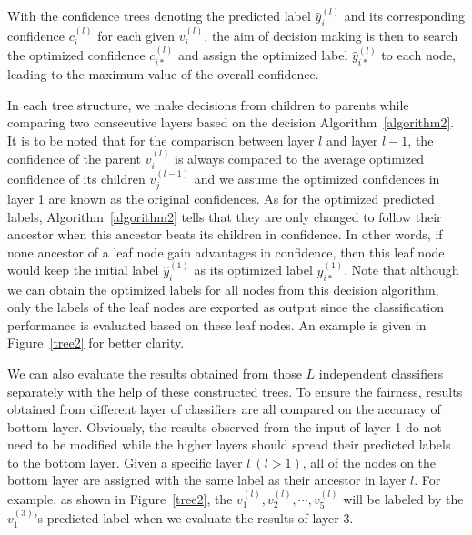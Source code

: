 \documentclass[letterpaper, 10 pt, conference]{ieeeconf}  %
\begin{document}
With the confidence trees denoting the predicted label $\hat{y}_i^{(l)}$  and its corresponding confidence $c_i^{(l)}$ for each given $v_i^{(l)}$, the aim of decision making is then to search the optimized confidence $c_{i*}^{(l)}$ and assign the optimized label $\hat{y}_{i*}^{(l)}$ to each node, leading to the maximum value of the overall confidence.

In each tree structure, we make decisions from children to parents while comparing two consecutive layers based on the decision Algorithm~\ref{algorithm2}. It is to be noted that for the comparison between layer $l$ and layer $l-1$, the confidence of the parent $v_i^{(l)}$ is always compared to the average optimized confidence of its children $v_j^{(l-1)}$ and we assume the optimized confidences in layer 1 are known as the original confidences. As for the optimized predicted labels, Algorithm~\ref{algorithm2} tells that they are only changed to follow their ancestor when this ancestor beats its children in confidence. In other words, if none ancestor of a leaf node gain advantages in confidence, then this leaf node would keep the initial label $\hat{y}_i^{(1)}$ as its optimized label $\hat{y}_{i*}^{(1)}$. Note that although we can obtain the optimized labels for all nodes from this decision algorithm, only the labels of the leaf nodes are exported as output since the classification performance is evaluated based on these leaf nodes. An example is given in Figure~\ref{tree2} for better clarity.








We can also evaluate the results obtained from those $L$ independent classifiers separately with the help of these constructed trees. To ensure the fairness, results obtained from different layer of classifiers are all compared on the accuracy of bottom layer. Obviously, the results observed from the input of layer 1 do not need to be modified while the higher layers should spread their predicted labels to the bottom layer. Given a specific layer $l~(l>1)$, all of the nodes on the bottom layer are assigned with the same label as their ancestor in layer $l$. For example, as shown in Figure~\ref{tree2}, the $v_1^{(l)},v_2^{(l)},\cdots,v_5^{(l)}$ will be labeled by the $v_1^{(3)}$'s predicted label when we evaluate the results of layer 3.
\end{document}

